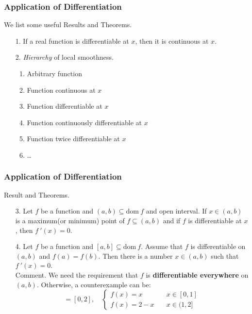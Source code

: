 \documentclass{beamer}
\begin{document}
\begin{frame}
    \frametitle{Application of Differentiation}
We list some useful Results and Theorems.
\begin{itemize}
    \item[1.] If a real function is differentiable at $x$, then it is continuous at $x$.
    \vspace{0.5em}
    \item[2.] \emph{Hierarchy} of local smoothness.
    \begin{enumerate}
        \item Arbitrary function
        \item Function continuous at $x$
        \item Function differentiable at $x$
        \item Function continuously differentiable at $x$
        \item Function twice differentiable at $x$
        \item \dots
    \end{enumerate}
\end{itemize}


\end{frame}

\begin{frame}
    \frametitle{Application of Differentiation}
Result and Theorems.\\
\begin{enumerate}
    \item[3.] Let $f$ be a function and $(a,b)\subseteq \text{dom}\  f$ and open interval. If $x\in(a,b)$ is a 
        maximum(or minimum) point of $f\subseteq(a,b)$ and if $f$ is differentiable at $x$, then $f~'(x)=0$.
    \vspace{0.5em}
    \item[4.] Let $f$ be a function and $[a,b]\subseteq \text{dom}\  f$. Assume that $f$ is differentiable on $(a,b)$ and 
        $f(a)=f(b)$. Then there is a number $x\in(a,b)$ such that $f~'(x)=0$.\\
        \vspace{0.3em}
        Comment. We need the requirement that $f$ is \textbf{differentiable everywhere} on $(a,b)$. Otherwise, a 
        counterexample can be:
        \begin{equation*}
            [a,b]=[0,2],\quad 
            \begin{cases}
                f(x)=x\qquad &x\in[0,1]\\
                f(x)=2-x\quad &x\in(1,2]
            \end{cases}
        \end{equation*}
        
\end{enumerate}


\end{frame}
\end{document}
